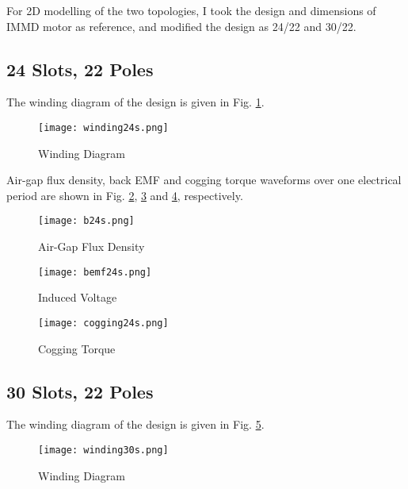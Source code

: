 \documentclass{reportClass}
\begin{document}
For 2D modelling of the two topologies, I took the design and dimensions of IMMD motor as reference, and modified the design as 24/22 and 30/22.\\

\subsection{24 Slots, 22 Poles}

The winding diagram of the design is given in Fig. \ref{fig:wdg24}.\\

\begin{figure}[h!]
    \centering
    \texttt{[image: winding24s.png]}
    \caption{Winding Diagram}
    \label{fig:wdg24}
\end{figure}

Air-gap flux density, back EMF and cogging torque waveforms over one electrical period are shown in Fig. \ref{fig:b24}, \ref{fig:bemf24} and \ref{fig:cog24}, respectively.\\

\begin{figure}[h!]
    \centering
    \texttt{[image: b24s.png]}
    \caption{Air-Gap Flux Density}
    \label{fig:b24}
\end{figure}

\begin{figure}[h!]
    \centering
    \texttt{[image: bemf24s.png]}
    \caption{Induced Voltage}
    \label{fig:bemf24}
\end{figure}

\begin{figure}[h!]
    \centering
    \texttt{[image: cogging24s.png]}
    \caption{Cogging Torque}
    \label{fig:cog24}
\end{figure}
\subsection{30 Slots, 22 Poles}


The winding diagram of the design is given in Fig. \ref{fig:wdg30}.\\


\begin{figure}[h!]
    \centering
    \texttt{[image: winding30s.png]}
    \caption{Winding Diagram}
    \label{fig:wdg30}
\end{figure}
\end{document}
